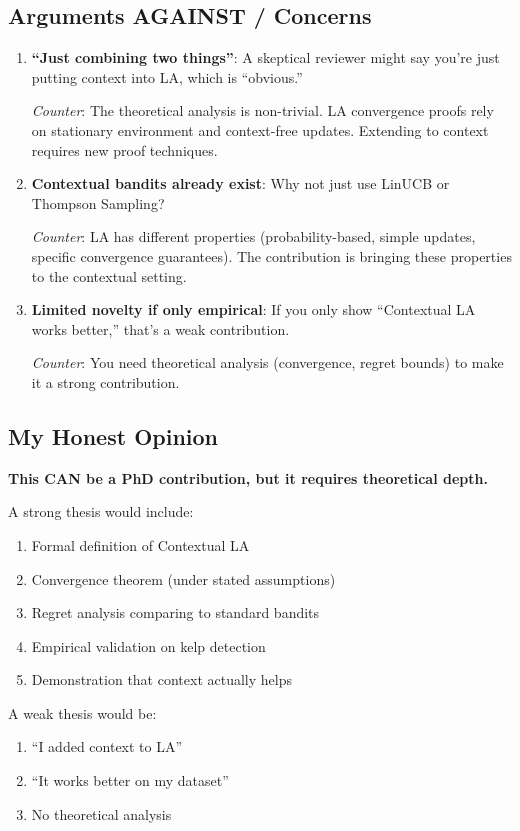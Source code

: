 \documentclass[11pt]{article}
\begin{document}
\subsection{Arguments AGAINST / Concerns}

\begin{enumerate}
  \item \textbf{``Just combining two things''}: A skeptical reviewer might say you're just putting context into LA, which is ``obvious.''

  \textit{Counter}: The theoretical analysis is non-trivial. LA convergence proofs rely on stationary environment and context-free updates. Extending to context requires new proof techniques.

  \item \textbf{Contextual bandits already exist}: Why not just use LinUCB or Thompson Sampling?

  \textit{Counter}: LA has different properties (probability-based, simple updates, specific convergence guarantees). The contribution is bringing these properties to the contextual setting.

  \item \textbf{Limited novelty if only empirical}: If you only show ``Contextual LA works better,'' that's a weak contribution.

  \textit{Counter}: You need theoretical analysis (convergence, regret bounds) to make it a strong contribution.
\end{enumerate}

\subsection{My Honest Opinion}

\textbf{This CAN be a PhD contribution, but it requires theoretical depth.}

A strong thesis would include:
\begin{enumerate}
  \item Formal definition of Contextual LA
  \item Convergence theorem (under stated assumptions)
  \item Regret analysis comparing to standard bandits
  \item Empirical validation on kelp detection
  \item Demonstration that context actually helps
\end{enumerate}

A weak thesis would be:
\begin{enumerate}
  \item ``I added context to LA''
  \item ``It works better on my dataset''
  \item No theoretical analysis
\end{enumerate}
\end{document}
